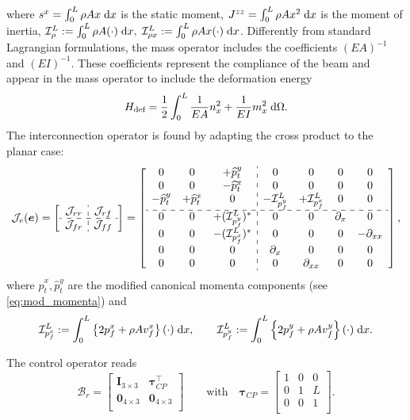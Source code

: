 where  $s^x = \int_{0}^{L} \rho A x \d{x}$ is the static moment, $J^{zz} = \int_{0}^{L} \rho A x^2 \d{x}$ is the moment of inertia, $\mathcal{I}_\rho^L := \int_{0}^L \rho A (\cdot) \d{x}, \; \mathcal{I}_{\rho x}^L := \int_{0}^L \rho A x (\cdot) \d{x}$. Differently from standard Lagrangian formulations, the mass operator includes the coefficients $(EA)^{-1}$ and $(EI)^{-1}$. These coefficients represent the compliance of the beam and appear in the mass operator to include the deformation energy
	\begin{equation*}
	H_{\text{def}} = \frac{1}{2}\int_{0}^L \frac{1}{EA} n_x^2 + \frac{1}{EI} m_x^2  \d\Omega.
	\end{equation*}
The interconnection operator is found by adapting the cross product to the planar case:
\begin{equation}
\label{eq:EB_J}
\mathcal{J}_{e}(\bm{e}) = 
\left[ \begin{array}{c:c}
{\mathcal{J}}_{rr} & {\mathcal{J}}_{rf} \\
\hdashline
{\mathcal{J}}_{fr} & {\mathcal{J}}_{ff} \\
\end{array} \right] = 
\left[ \begin{array}{ccc:cccc}
0 & 0 & +\widehat{p}_t^y      & 0 & 0 & 0 & 0 \\
0 & 0 & -\widehat{p}_t^x     & 0 & 0 & 0 & 0 \\
-\widehat{p}_t^y & +\widehat{p}_t^x & 0 & -\mathcal{I}_{p_f^y}^{L} & +\mathcal{I}_{p_f^x}^{L} & 0 & 0 \\
\hdashline 
0 & 0 & +(\mathcal{I}_{p_f^y}^{L})^* & 0 & 0 & \partial_x & 0  \\
0 & 0 & -(\mathcal{I}_{p_f^x}^{L})^* & 0 & 0 & 0 & -\partial_{xx} \\
0 & 0 & 0 & \partial_{x} & 0 & 0 & 0 \\
0 & 0 & 0 & 0 & \partial_{xx} & 0 & 0 \\
\end{array} \right],
\end{equation}
where $\widehat{p}_t^x, \widehat{p}_t^y$ are the modified canonical momenta components (see \eqref{eq:mod_momenta}) and 
$$\mathcal{I}_{p_f^x}^{L} := \int_{0}^{L} \left\{2 p_f^x + \rho A v_f^x \right\} (\cdot) \d{x}, \qquad \mathcal{I}_{p_f^y}^{L} := \int_{0}^{L} \left\{2 p_f^y + \rho A v_f^y \right\} (\cdot) \d{x}.$$ 

The control operator reads
\begin{equation}
{\mathcal{B}}_r = \begin{bmatrix}
\bm{I}_{3\times 3} & \bm\tau_{CP}^\top \\
\bm{0}_{4\times 3} & \bm{0}_{4\times 3} \\
\end{bmatrix} \qquad \text{with} \quad
\bm\tau_{CP} = \begin{bmatrix}
1 & 0 & 0 \\
0 & 1 & L \\
0 & 0 & 1 \\
\end{bmatrix}.
\end{equation}

